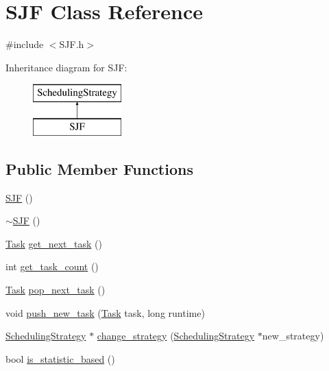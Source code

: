 \hypertarget{class_s_j_f}{}\section{S\+J\+F Class Reference}
\label{class_s_j_f}


{\ttfamily \#include $<$S\+J\+F.\+h$>$}

Inheritance diagram for S\+J\+F\+:\begin{figure}[H]
\begin{center}
\leavevmode
\includegraphics[height=2.000000cm]{class_s_j_f}
\end{center}
\end{figure}
\subsection*{Public Member Functions}
\begin{DoxyCompactItemize}
\item 
\hyperlink{class_s_j_f_aad25acf31705ffe3de354d7ed9d246b0}{S\+J\+F} ()
\item 
\hyperlink{class_s_j_f_a355e1c11942bdc83724bb522788ef85c}{$\sim$\+S\+J\+F} ()
\item 
\hyperlink{_types_8h_a0c77930ab3818a1680c59353f627fba8}{Task} \hyperlink{class_s_j_f_ae4b4643d0ab5399d9ead911324316f8b}{get\+\_\+next\+\_\+task} ()
\item 
int \hyperlink{class_s_j_f_a52050fbf818f6ce0e7de4d206d768af7}{get\+\_\+task\+\_\+count} ()
\item 
\hyperlink{_types_8h_a0c77930ab3818a1680c59353f627fba8}{Task} \hyperlink{class_s_j_f_aa9c95d30d23d76c6738c9b4076574d68}{pop\+\_\+next\+\_\+task} ()
\item 
void \hyperlink{class_s_j_f_acf85a4d139f386a2a82578b32a1b3989}{push\+\_\+new\+\_\+task} (\hyperlink{_types_8h_a0c77930ab3818a1680c59353f627fba8}{Task} task, long runtime)
\item 
\hyperlink{class_scheduling_strategy}{Scheduling\+Strategy} $\ast$ \hyperlink{class_s_j_f_aa1816e24350bf8ee69641e79bc4354e1}{change\+\_\+strategy} (\hyperlink{class_scheduling_strategy}{Scheduling\+Strategy} $\ast$new\+\_\+strategy)
\item 
bool \hyperlink{class_s_j_f_a113a0c4ba9bf1ede8e3189c882a7b8c7}{is\+\_\+statistic\+\_\+based} ()
\end{DoxyCompactItemize}
